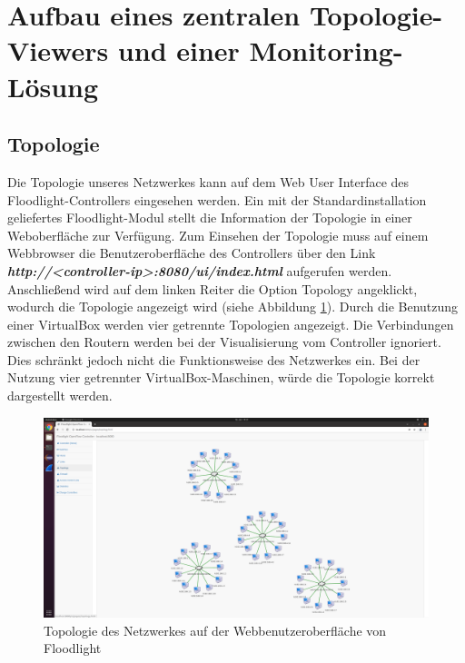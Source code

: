 \documentclass[fontsize=12pt,paper=a4,open=any,parskip=half,
  twoside=false,toc=listof,toc=bibliography,fleqn,leqno,
  captions=nooneline,captions=tableabove,british]{scrbook}
\begin{document}
\section{Aufbau eines zentralen Topologie-Viewers und einer Monitoring-Lösung}

\subsection{Topologie}
Die Topologie unseres Netzwerkes kann auf dem Web User Interface des Floodlight-Controllers eingesehen werden. Ein mit der Standardinstallation geliefertes Floodlight-Modul stellt die Information der Topologie in einer Weboberfläche zur Verfügung. Zum Einsehen der Topologie muss auf einem Webbrowser die Benutzeroberfläche des Controllers über den Link \textit{\textbf{http://<controller-ip>:8080/ui/index.html}} aufgerufen werden. Anschließend wird auf dem linken Reiter die Option Topology angeklickt, wodurch die Topologie angezeigt wird (siehe Abbildung \ref{topo}). Durch die Benutzung einer VirtualBox werden vier getrennte Topologien angezeigt. Die Verbindungen zwischen den Routern werden bei der Visualisierung vom Controller ignoriert. Dies schränkt jedoch nicht die Funktionsweise des Netzwerkes ein. Bei der Nutzung vier getrennter VirtualBox-Maschinen, würde die Topologie korrekt dargestellt werden.

\begin{figure}[H]
 \centering
 \includegraphics[width=1.0\textwidth]{Bilder/topo}
 \captionsetup{justification=centering}
 \caption{Topologie des Netzwerkes auf der Webbenutzeroberfläche von Floodlight}
 \label{topo}
\end{figure}
\end{document}
